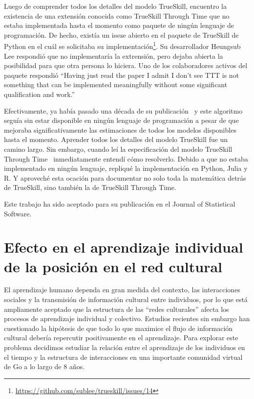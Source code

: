 \documentclass[a4paper,11pt]{book}
\theoremstyle{definition}
\begin{document}

Luego de comprender todos los detalles del modelo TrueSkill, encuentro la existencia de una extensi\'on conocida como TrueSkill Through Time que no estaba implementada hasta el momento como paquete de ning\'un lenguaje de programaci\'on.
%
De hecho, exist\'ia un issue abierto en el paquete de TrueSkill de Python en el cu\'al se solicitaba su implementaci\'on\footnote{\url{https://github.com/sublee/trueskill/issues/14}}.
%
Su desarrollador Heungsub Lee respondi\'o que no implementar\'ia la extrensi\'on, pero dejaba abierta la posibilidad para que otra persona lo hiciera.
%
Uno de los colaboradores activos del paquete respondi\'o ``Having just read the paper I admit I don't see TTT is not something that can be implemented meaningfully without some significant qualification and work.''


Efectivamente, ya hab\'ia pasado una d\'ecada de su publicaci\'on~\cite{Dangauthier2007} y este algoritmo segu\'ia sin estar disponible en ning\'un lenguaje de programaci\'on a pesar de que mejoraba significativamente las estimaciones de todos los modelos disponibles hasta el momento.
%
Aprender todos los detalles del modelo TrueSkill fue un camino largo.
%
Sin embargo, cuando le\'i la especificaci\'on del modelo TrueSkill Through Time~\cite{Dangauthier2007} inmediatamente entend\'i c\'omo resolverlo.
%
%
Debido a que no estaba implementado en ning\'un lenguaje, repliqu\'e la implementaci\'on en Python, Julia y R.
%
Y aprovech\'e esta ocaci\'on para documentar no solo toda la matem\'atica detr\'as de TrueSkill, sino tambi\'en la de TrueSkill Through Time.


Este trabajo ha sido aceptado para su publicaci\'on en el Journal of Statistical Software.

\section{Efecto en el aprendizaje individual de la posici\'on en el red cultural}

El aprendizaje humano dependa en gran medida del contexto, las interacciones sociales y la transmisi\'on de informaci\'on cultural entre individuos, por lo que est\'a ampliamente aceptado que la estructura de las ``redes culturales'' afecta los procesos de aprendizaje individual y colectivo.
%
Estudios recientes sin embargo han cuestionado la hip\'otesis de que todo lo que maximice el flujo de informaci\'on cultural deber\'ia repercutir positivamente en el aprendizaje.
%
Para explorar este problema decidimos estudiar la relaci\'on entre el aprendizaje de los individuos en el tiempo y la estructura de interacciones en una importante comunidad virtual de Go a lo largo de 8 a\~nos.
\end{document}
